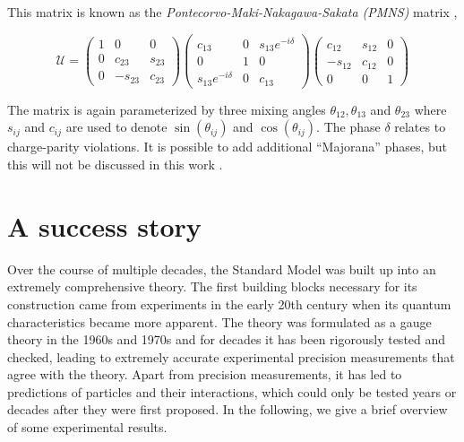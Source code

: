 \noindent This matrix is known as the \textit{Pontecorvo-Maki-Nakagawa-Sakata (PMNS)} matrix \cite{doi:10.1143/PTP.28.870},

\begin{equation}
\mathcal{U} = \begin{pmatrix}
1 	& 0 		& 0 \\
0 	& c_{23}	& s_{23} \\
0	& -s_{23} 	& c_{23}
\end{pmatrix}
\begin{pmatrix}
c_{13} 				& 0 		& s_{13}e^{-i\delta} \\
0 					& 1			& 0 \\
s_{13}e^{-i\delta}	& 0 		& c_{13}
\end{pmatrix}
\begin{pmatrix}
c_{12} 	& s_{12}	& 0 \\
-s_{12} & c_{12}	& 0 \\
0		& 0			& 1
\end{pmatrix}
\end{equation}

\noindent The matrix is again parameterized by three mixing angles $\theta_{12}, \theta_{13}$ and $\theta_{23}$ where $s_{ij}$ and $c_{ij}$ are used to denote $\sin\left(\theta_{ij}\right)$ and $\cos\left(\theta_{ij}\right)$. The phase $\delta$ relates to charge-parity violations. It is possible to add additional ``Majorana'' phases, but this will not be discussed in this work \cite{Giganti:2017fhf}.
 
\section{A success story}
Over the course of multiple decades, the Standard Model was built up into an extremely comprehensive theory. The first building blocks necessary for its construction came from experiments in the early 20th century when its quantum characteristics became more apparent. The theory was formulated as a gauge theory in the 1960s and 1970s and for decades it has been rigorously tested and checked, leading to extremely accurate experimental precision measurements that agree with the theory. Apart from precision measurements, it has led to predictions of particles and their interactions, which could only be tested years or decades after they were first proposed. In the following, we give a brief overview of some experimental results.

\iffalse
